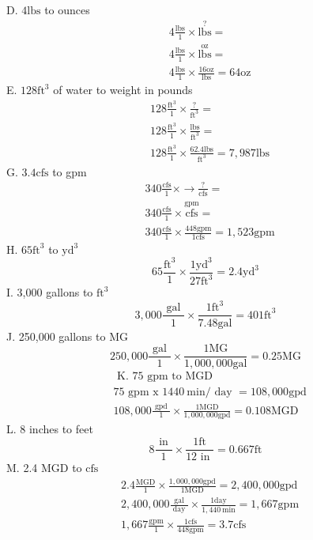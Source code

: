 \documentclass[10pt]{article}
\begin{document}
D. $4 \mathrm{lbs}$ to ounces
$$
\begin{aligned}
& 4 \frac{\mathrm{lbs}}{1} \times \stackrel{?}{\mathrm{lbs}}= \\
& 4 \frac{\mathrm{lbs}}{1} \times \stackrel{\mathrm{oz}}{\mathrm{lbs}}= \\
& 4 \frac{\mathrm{lbs}}{1} \times \frac{16 \mathrm{oz}}{\mathrm{lbs}}=64 \mathrm{oz}
\end{aligned}
$$
E. $128 \mathrm{ft}^{3}$ of water to weight in pounds
$$
\begin{aligned}
&128 \frac{\mathrm{ft}^{3}}{1} \times \frac{?}{\mathrm{ft}^{3}}= \\
&128 \frac{\mathrm{ft}^{3}}{1} \times \frac{\mathrm{lbs}}{\mathrm{ft}^{3}}= \\
&128 \frac{\mathrm{ft}^{3}}{1} \times \frac{62.4 \mathrm{lbs}}{\mathrm{ft}^{3}}=7,987 \mathrm{lbs}
\end{aligned}
$$
G. $3.4 \mathrm{cfs}$ to gpm
$$
\begin{aligned}
& 340 \frac{\mathrm{cfs}}{1} \times \longrightarrow \frac{?}{\mathrm{cfs}}= \\
& 340 \frac{\mathrm{cfs}}{1} \times \stackrel{\mathrm{gpm}}{\mathrm{cfs}}= \\
& 340 \frac{\mathrm{cfs}}{1} \times \frac{448 \mathrm{gpm}}{1 \mathrm{cfs}}=1,523 \mathrm{gpm}
\end{aligned}
$$
H. $65 \mathrm{ft}^{3}$ to $\mathrm{yd}^{3}$
$$
65 \frac{\mathrm{ft}^{3}}{1} \times \frac{1 \mathrm{yd}^{3}}{27 \mathrm{ft}^{3}}=2.4 \mathrm{yd}^{3}
$$
I. 3,000 gallons to $\mathrm{ft}^{3}$
$$
3,000 \frac{\text { gal }}{1} \times \frac{1 \mathrm{ft}^{3}}{7.48 \mathrm{gal}}=401 \mathrm{ft}^{3}
$$
J. 250,000 gallons to $\mathrm{MG}$
$$
250,000 \frac{\text { gal }}{1} \times \frac{1 \mathrm{MG}}{1,000,000 \mathrm{gal}}=0.25 \mathrm{MG}
$$
$$
\begin{aligned}
&\text { K. } 75 \text { gpm to MGD } \\
&75 \text { gpm x } 1440 \mathrm{~min} / \text { day }=108,000 \mathrm{gpd} \\
&108,000 \frac{\text { gpd }}{1} \times \frac{1 \mathrm{MGD}}{1,000,000 \mathrm{gpd}}=0.108 \mathrm{MGD}
\end{aligned}
$$
L. 8 inches to feet
$$
8 \frac{\text { in }}{1} \times \frac{1 \mathrm{ft}}{12 \text { in }}=0.667 \mathrm{ft}
$$
M. 2.4 MGD to $\mathrm{cfs}$
$$
\begin{aligned}
&2.4 \frac{\mathrm{MGD}}{1} \times \frac{1,000,000 \mathrm{gpd}}{1 \mathrm{MGD}}=2,400,000 \mathrm{gpd} \\
&2,400,000 \frac{\mathrm{gal}}{\text { day }} \times \frac{1 \mathrm{day}}{1,440 \mathrm{~min}}=1,667 \mathrm{gpm} \\
&1,667 \frac{\mathrm{gpm}}{1} \times \frac{1 \mathrm{cfs}}{448 \mathrm{gpm}}=3.7 \mathrm{cfs}
\end{aligned}
$$
\end{document}
